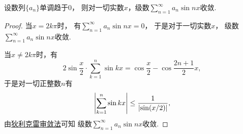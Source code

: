 \begin{example}\label{example:无穷级数.单调收敛数列与正弦函数列的乘积的级数收敛}
设数列\(\{a_n\}\)单调趋于\(0\)，
则对一切实数\(x\)，级数\(\sum_{n=1}^\infty a_n \sin n x\)收敛.
\begin{proof}
当\(x=2k\pi\)时，
有\(\sum_{n=1}^\infty a_n \sin n x = 0\)，
于是对于一切实数\(x\)，
级数\(\sum_{n=1}^\infty a_n \sin n x\)收敛.

当\(x\neq2k\pi\)时，有\[
	2\sin\frac{x}{2} \cdot \sum_{k=1}^n \sin kx
	= \cos\frac{x}{2} - \cos\frac{2n+1}{2}x,
\]
于是对一切正整数\(n\)有\[
	\abs{\sum_{k=1}^n \sin k x}
	\leq \frac1{\abs{\sin(x/2)}},
\]
由\hyperref[theorem:无穷级数.无穷级数的阿贝尔--狄利克雷审敛法]{狄利克雷审敛法}可知
级数\(\sum_{n=1}^\infty a_n \sin n x\)收敛.
\end{proof}
\end{example}
